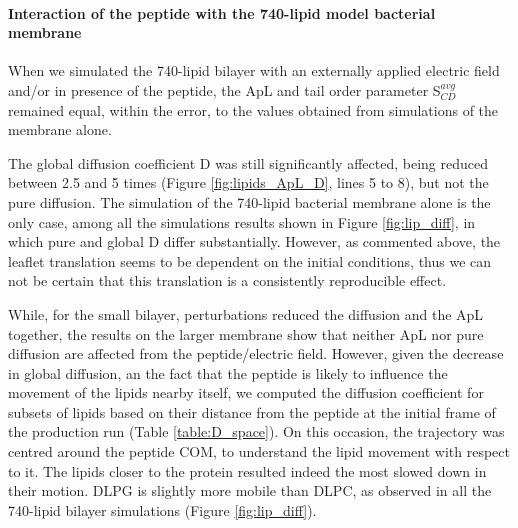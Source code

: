 \paragraph{Interaction of the peptide with the 740-lipid model bacterial membrane}

When we simulated the 740-lipid bilayer with an externally applied electric field and/or in presence of the peptide, the ApL and tail order parameter S$^{avg}_{CD}$ remained equal, within the error, to the values obtained from simulations of the membrane alone.

The global diffusion coefficient D was still significantly affected, being reduced between 2.5 and 5 times (Figure \ref{fig:lipids_ApL_D}, lines 5 to 8), but not the pure diffusion. The simulation of the 740-lipid bacterial membrane alone is the only case, among all the simulations results shown in Figure \ref{fig:lip_diff}, in which pure and global D differ substantially. However, as commented above, the leaflet translation seems to be dependent on the initial conditions, thus we can not be certain that this translation is a consistently reproducible effect.

While, for the small bilayer, perturbations reduced the diffusion and the ApL together, the results on the larger membrane show that neither ApL nor pure diffusion are affected from the peptide/electric field.
%
However, given the decrease in global diffusion, an the fact that the peptide is likely to influence the movement of the lipids nearby itself, we computed the diffusion coefficient for subsets of lipids based on their distance from the peptide at the initial frame of the production run (Table \ref{table:D_space}). On this occasion, the trajectory was centred around the peptide COM, to understand the lipid movement with respect to it. The lipids closer to the protein resulted indeed the most slowed down in their motion. DLPG is slightly more mobile than DLPC, as observed in all the 740-lipid bilayer simulations (Figure \ref{fig:lip_diff}).

